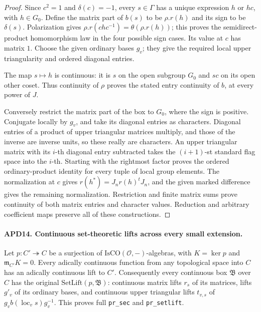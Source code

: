 \documentclass[11pt,a4paper]{article}
\numberwithin{equation}{section}
\theoremstyle{remark}\newtheorem{remark}[theorem]{Remark}
\begin{document}
\begin{proof}
Since \(c^2=1\) and \(\delta(c)=-1\), every \(s\in\Gamma\)
has a unique expression \(h\) or \(hc\), with \(h\in G_0\).
Define the matrix part of \(b(s)\) to be \(\rho.r(h)\) and
its sign to be \(\delta(s)\).  Polarization gives
\(\rho.r(chc^{-1})=\theta(\rho.r(h))\); this proves the
semidirect-product homomorphism law in the four possible sign
cases.  Its value at \(c\) has matrix \(1\).  Choose the
given ordinary bases \(g_v\); they give the required local
upper triangularity and ordered diagonal entries.

The map \(s\mapsto h\) is continuous: it is \(s\) on the
open subgroup \(G_0\) and \(sc\) on its open other coset.
Thus continuity of \(\rho\) proves the stated entry continuity
of \(b\), at every power of \(J\).

Conversely restrict the matrix part of the box to \(G_0\),
where the sign is positive.  Conjugate locally by \(g_v\),
and take its diagonal entries as characters.  Diagonal entries
of a product of upper triangular matrices multiply, and those
of the inverse are inverse units, so these really are characters.
An upper triangular matrix with its \(i\)-th diagonal entry
subtracted takes the \((i+1)\)-st standard flag space into the
\(i\)-th.  Starting with the rightmost factor proves the
ordered ordinary-product identity for every tuple of local
group elements.  The normalization at \(c\) gives
\(r(h^*)=J_nr(h)^tJ_n\), and the given marked difference
gives the remaining normalization.  Restriction and finite matrix
sums prove continuity of both matrix entries and character values.
Reduction and arbitrary coefficient maps preserve all of these
constructions.
\end{proof}

\paragraph{APD14. Continuous set-theoretic lifts across every small extension.}
\label{claim:APD14}
Let \(p:C'\twoheadrightarrow C\) be a surjection of
\(\mathrm{IsCO}(\mathcal O,-)\)-algebras, with
\(K=\ker p\) and \(\mathfrak m_{C'}K=0\).  Every
adically continuous function from any topological space into
\(C\) has an adically continuous lift to \(C'\).
Consequently every continuous box \(\mathfrak B\) over \(C\)
has the original \(\mathrm{SetLift}(p,\mathfrak B)\): continuous
matrix lifts \(r_s\) of its matrices, lifts \(g'_v\) of its
ordinary bases, and continuous upper triangular lifts \(t_{v,s}\)
of \(g_vb(\operatorname{loc}_v s)g_v^{-1}\).
This proves full \texttt{pr\_\allowbreak sec} and \texttt{pr\_\allowbreak setlift}.
\end{document}
